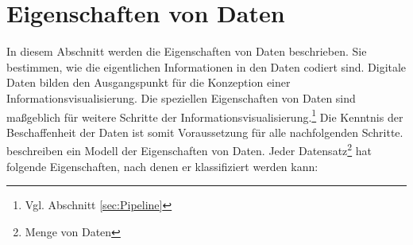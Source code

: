 \documentclass[a4paper, 
               12pt,
               DIV=calc,
               version=first,
               pdftex,
               headsepline,
               footsepline,
               bibtotocnumbered,
               liststotocnumbered]{scrreprt}
\begin{document}
\section{Eigenschaften von Daten}
\label{sec:EigenschaftenDaten}
In diesem Abschnitt werden die Eigenschaften von Daten beschrieben. Sie bestimmen, wie die eigentlichen Informationen
in den Daten codiert sind.
Digitale Daten bilden den Ausgangspunkt für die Konzeption einer Informationsvisualisierung. Die speziellen
Eigenschaften von Daten sind maßgeblich für weitere Schritte der Informationsvisualisierung.\footnote{Vgl. 
Abschnitt \ref{sec:Pipeline}}
Die Kenntnis der Beschaffenheit der Daten ist somit Voraussetzung für alle nachfolgenden Schritte.
\cite{Schumann} beschreiben ein Modell der Eigenschaften von Daten. Jeder Datensatz\footnote{Menge von Daten}
hat folgende Eigenschaften, nach denen er klassifiziert werden kann:
\end{document}
